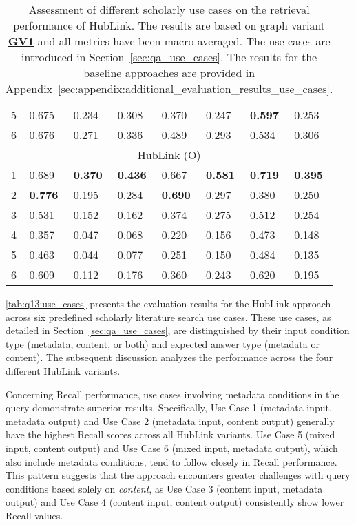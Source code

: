 \begin{table}[t]
\begin{tabular}{@{}llllllll@{}}
5 & 0.675 & 0.234 & 0.308 & 0.370 & 0.247 & \textbf{0.597} & 0.253 \\
6 & 0.676 & 0.271 & 0.336 & 0.489 & 0.293 & 0.534 & 0.306 \\
\midrule
\multicolumn{8}{c}{HubLink (O)} \\
\midrule
1 & 0.689 & \textbf{0.370} & \textbf{0.436} & 0.667 & \textbf{0.581} & \textbf{0.719} & \textbf{0.395} \\
2 & \textbf{0.776} & 0.195 & 0.284 & \textbf{0.690} & 0.297 & 0.380 & 0.250 \\
3 & 0.531 & 0.152 & 0.162 & 0.374 & 0.275 & 0.512 & 0.254 \\
4 & 0.357 & 0.047 & 0.068 & 0.220 & 0.156 & 0.473 & 0.148 \\
5 & 0.463 & 0.044 & 0.077 & 0.251 & 0.150 & 0.484 & 0.135 \\
6 & 0.609 & 0.112 & 0.176 & 0.360 & 0.243 & 0.620 & 0.195 \\
\bottomrule
\end{tabular}%
\caption[HubLink Performance by Use Case]{Assessment of different scholarly use cases on the retrieval performance of HubLink. The results are based on graph variant \hyperref[enum:gv1]{\textbf{GV1}} and all metrics have been macro-averaged. The use cases are introduced in Section~\ref{sec:qa_use_cases}. The results for the baseline approaches are provided in Appendix~\ref{sec:appendix:additional_evaluation_results_use_cases}.}
\label{tab:q13:use_cases}
\end{table}

\autoref{tab:q13:use_cases} presents the evaluation results for the HubLink approach across six predefined scholarly literature search use cases. These use cases, as detailed in Section~\ref{sec:qa_use_cases}, are distinguished by their input condition type (metadata, content, or both) and expected answer type (metadata or content). The subsequent discussion analyzes the performance across the four different HubLink variants.

Concerning Recall performance, use cases involving metadata conditions in the query demonstrate superior results. Specifically, Use Case 1 (metadata input, metadata output) and Use Case 2 (metadata input, content output) generally have the highest Recall scores across all HubLink variants. Use Case 5 (mixed input, content output) and Use Case 6 (mixed input, metadata output), which also include metadata conditions, tend to follow closely in Recall performance. This pattern suggests that the approach encounters greater challenges with query conditions based solely on \emph{content}, as Use Case 3 (content input, metadata output) and Use Case 4 (content input, content output) consistently show lower Recall values.


